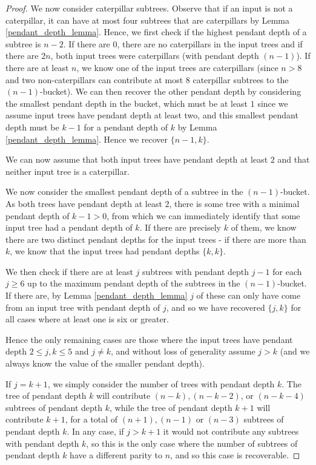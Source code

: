 \documentclass[12pt]{article}
\theoremstyle{definition}
\begin{document}
\begin{proof}
    We now consider caterpillar subtrees. Observe that if an input is not a caterpillar, it can have at most four subtrees that are caterpillars by Lemma \ref{pendant_depth_lemma}. Hence, we first check if the highest pendant depth of a subtree is $n-2$. If there are $0$, there are no caterpillars in the input trees and if there are $2n$, both input trees were caterpillars (with pendant depth $(n-1)$). If there are at least $n$, we know one of the input trees are caterpillars (since $n>8$ and two non-caterpillars can contribute at most $8$ caterpillar subtrees to the $(n-1)$-bucket). We can then recover the other pendant depth by considering the smallest pendant depth in the bucket, which must be at least $1$ since we assume input trees have pendant depth at least two, and this smallest pendant depth must be $k-1$ for a pendant depth of $k$ by Lemma \ref{pendant_depth_lemma}. Hence we recover $\{n-1,k\}$.
    
    We can now assume that both input trees have pendant depth at least $2$ and that neither input tree is a caterpillar.

    We now consider the smallest pendant depth of a subtree in the $(n-1)$-bucket. As both trees have pendant depth at least $2$, there is some tree with a minimal pendant depth of $k-1>0$, from which we can immediately identify that some input tree had a pendant depth of $k$. If there are precisely $k$ of them, we know there are two distinct pendant depths for the input trees - if there are more than $k$, we know that the input trees had pendant depths $\{k,k\}$. 

    We then check if there are at least $j$ subtrees with pendant depth $j-1$ for each $j \ge 6$ up to the maximum pendant depth of the subtrees in the $(n-1)$-bucket. If there are, by Lemma \ref{pendant_depth_lemma} $j$ of these can only have come from an input tree with pendant depth of $j$, and so we have recovered $\{j,k\}$ for all cases where at least one is six or greater.

    Hence the only remaining cases are those where the input trees have pendant depth $2 \le j,k \le 5$ and $j \ne k$, and without loss of generality assume $j>k$ (and we always know the value of the smaller pendant depth).

    If $j=k+1$, we simply consider the number of trees with pendant depth $k$. The tree of pendant depth $k$ will contribute $(n-k), (n-k-2)$, or $(n-k-4)$ subtrees of pendant depth $k$, while the tree of pendant depth $k+1$ will contribute $k+1$, for a total of $(n+1), (n-1)$ or $(n-3)$ subtrees of pendant depth $k$. In any case, if $j>k+1$ it would not contribute any subtrees with pendant depth $k$, so this is the only case where the number of subtrees of pendant depth $k$ have a different parity to $n$, and so this case is recoverable.


\end{proof}
\end{document}

